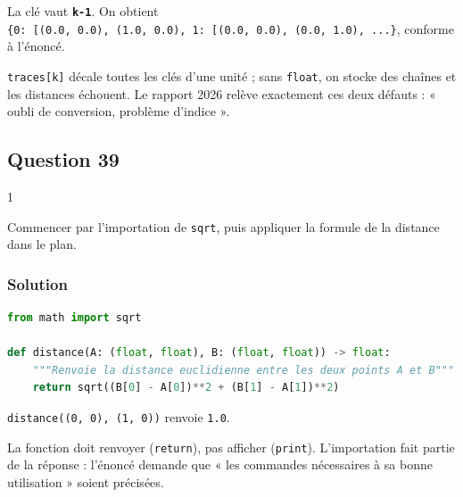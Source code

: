 \documentclass[11pt,a4paper]{article}
\begin{document}
La clé vaut \textbf{\texttt{k-1}}. On obtient \texttt{\{0:\allowbreak{}\ {[}(\allowbreak{}0.0,\allowbreak{}\ 0.0)\allowbreak{},\allowbreak{}\ (\allowbreak{}1.0,\allowbreak{}\ 0.0)\allowbreak{}{]}\allowbreak{},\allowbreak{}\ 1:\allowbreak{}\ {[}(\allowbreak{}0.0,\allowbreak{}\ 0.0)\allowbreak{},\allowbreak{}\ (\allowbreak{}0.0,\allowbreak{}\ 1.0)\allowbreak{}{]}\allowbreak{},\allowbreak{}\ ...\}}, conforme à l'énoncé.

\begin{piege}

\texttt{traces{[}k{]}} décale toutes les clés d'une unité ; sans \texttt{float}, on stocke des chaînes et les distances échouent. Le rapport 2026 relève exactement ces deux défauts : « oubli de conversion, problème d'indice ».

\end{piege}

\hypertarget{question-39}{%
\subsection{Question 39}\label{question-39}}

\begin{indication}{1}

Commencer par l'importation de \texttt{sqrt}, puis appliquer la formule de la distance dans le plan.

\end{indication}

\hypertarget{solution-38}{%
\subsubsection{Solution}\label{solution-38}}

\begin{lstlisting}[language=Python]
from math import sqrt

def distance(A: (float, float), B: (float, float)) -> float:
    """Renvoie la distance euclidienne entre les deux points A et B"""
    return sqrt((B[0] - A[0])**2 + (B[1] - A[1])**2)
\end{lstlisting}

\texttt{distance(\allowbreak{}(\allowbreak{}0,\allowbreak{}\ 0)\allowbreak{},\allowbreak{}\ (\allowbreak{}1,\allowbreak{}\ 0)\allowbreak{})\allowbreak{}} renvoie \texttt{1.0}.

\begin{piege}

La fonction doit renvoyer (\texttt{return}), pas afficher (\texttt{print}). L'importation fait partie de la réponse : l'énoncé demande que « les commandes nécessaires à sa bonne utilisation » soient précisées.

\end{piege}
\end{document}
